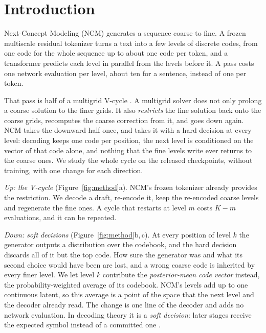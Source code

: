 \documentclass[11pt]{article}
\begin{document}
\section{Introduction}

Next-Concept Modeling (NCM) \citep{kumbong2026ncm} generates a sequence coarse to fine. A frozen multiscale residual
tokenizer turns a text into a few levels of discrete codes, from one code for the whole sequence up to about one code
per token, and a transformer predicts each level in parallel from the levels before it. A pass costs one network
evaluation per level, about ten for a sentence, instead of one per token.

That pass is half of a multigrid V-cycle \citep{brandt1977multigrid,briggs2000multigrid}. A multigrid solver does not
only prolong a coarse solution to the finer grids. It also \emph{restricts} the fine solution back onto the coarse
grids, recomputes the coarse correction from it, and goes down again. NCM takes the downward half once, and takes it
with a hard decision at every level: decoding keeps one code per position, the next level is conditioned on the vector
of that code alone, and nothing that the fine levels write ever returns to the coarse ones. We study the whole cycle
on the released checkpoints, without training, with one change for each direction.

\emph{Up: the V-cycle} (Figure~\ref{fig:method}a). NCM's frozen tokenizer already provides the restriction. We decode a
draft, re-encode it, keep the re-encoded coarse levels and regenerate the fine ones. A cycle that restarts at level
$m$ costs $K-m$ evaluations, and it can be repeated.

\emph{Down: soft decisions} (Figure~\ref{fig:method}b,\,c). At every position of level $k$ the generator outputs a
distribution over the codebook, and the hard decision discards all of it but the top code. How sure the generator was
and what its second choice would have been are lost, and a wrong coarse code is inherited by every finer level. We
let level $k$ contribute the \emph{posterior-mean code vector} instead, the probability-weighted average of its
codebook. NCM's levels add up to one continuous latent, so this average is a point of the space that the next level
and the decoder already read. The change is one line of the decoder and adds no network evaluation. In decoding theory
it is a \emph{soft decision}: later stages receive the expected symbol instead of a committed one
\citep{wang1999iterative,skoglund1999soft}.
\end{document}
